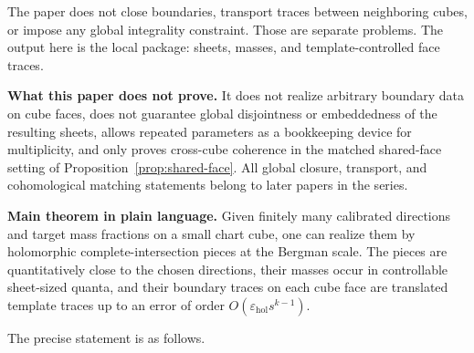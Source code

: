 \documentclass[11pt]{article}
\numberwithin{equation}{section}
\theoremstyle{plain}
\theoremstyle{definition}
\theoremstyle{remark}
\newcommand{\eps}{\varepsilon}
\begin{document}
The paper does not close boundaries, transport traces between neighboring cubes, or impose any global integrality constraint.  Those are separate problems.  The output here is the local package: sheets, masses, and template-controlled face traces.

\medskip

\noindent\textbf{What this paper does not prove.}
It does not realize arbitrary boundary data on cube faces, does not guarantee global disjointness or embeddedness of the resulting sheets, allows repeated parameters as a bookkeeping device for multiplicity, and only proves cross-cube coherence in the matched shared-face setting of Proposition~\ref{prop:shared-face}.  All global closure, transport, and cohomological matching statements belong to later papers in the series.

\medskip

\noindent\textbf{Main theorem in plain language.}
Given finitely many calibrated directions and target mass fractions on a small chart cube, one can realize them by holomorphic complete-intersection pieces at the Bergman scale.  The pieces are quantitatively close to the chosen directions, their masses occur in controllable sheet-sized quanta, and their boundary traces on each cube face are translated template traces up to an error of order $O(\eps_{\mathrm{hol}} s^{k-1})$.

\medskip

The precise statement is as follows.
\end{document}
